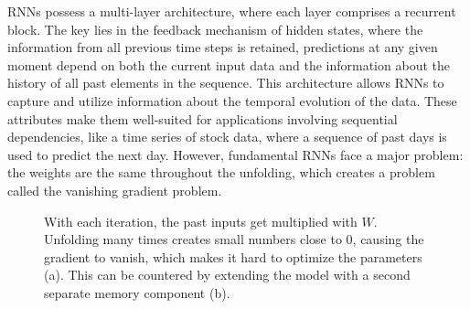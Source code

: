 RNNs possess a multi-layer architecture, where each layer comprises a recurrent block. The key lies in the feedback mechanism of hidden states, where the information from all previous time steps is retained, predictions at any given moment depend on both the current input data and the information about the history of all past elements in the sequence. This architecture allows RNNs to capture and utilize information about the temporal evolution of the data. These attributes make them well-suited for applications involving sequential dependencies, like a time series of stock data, where a sequence of past days is used to predict the next day.
However, fundamental RNNs face a major problem: the weights are the same throughout the unfolding, which creates a problem called the vanishing gradient problem. 

\begin{figure}[h]
\centering
  \hfill
  \caption{\cite{starmer2022} With each iteration, the past inputs get multiplied with $W$. Unfolding many times creates small numbers close to 0, causing the gradient to vanish, which makes it hard to optimize the parameters (a). This can be countered by extending the model with a second separate memory component (b).}
  \label{fig:extending_rnn}
\end{figure}

